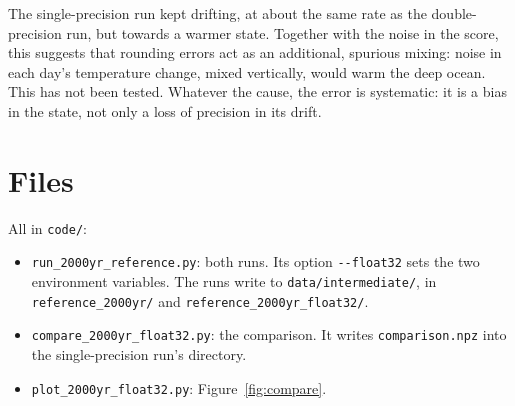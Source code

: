 \documentclass{article}
\begin{document}
The single-precision run kept drifting, at about the same rate as the double-precision run, but towards a warmer state. Together with the noise in the score, this suggests that rounding errors act as an additional, spurious mixing: noise in each day's temperature change, mixed vertically, would warm the deep ocean. This has not been tested. Whatever the cause, the error is systematic: it is a bias in the state, not only a loss of precision in its drift.

\section{Files}\label{sec:files}

All in \texttt{code/}:
\begin{itemize}
\item \texttt{run\_2000yr\_reference.py}: both runs. Its option \texttt{-{}-float32} sets the two environment variables. The runs write to \texttt{data/intermediate/}, in \texttt{reference\_2000yr/} and \texttt{reference\_2000yr\_float32/}.
\item \texttt{compare\_2000yr\_float32.py}: the comparison. It writes \texttt{comparison.npz} into the single-precision run's directory.
\item \texttt{plot\_2000yr\_float32.py}: Figure~\ref{fig:compare}.
\end{itemize}
\end{document}

